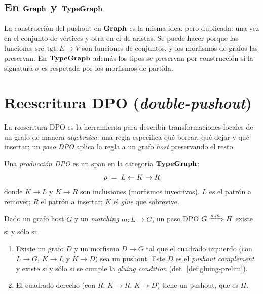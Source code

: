 \subsection*{En $\mathbf{Graph}$ y $\mathbf{TypeGraph}$}

La construcción del pushout en $\mathbf{Graph}$ es la misma idea, pero
duplicada: una vez en el conjunto de vértices y otra en el de aristas.
Se puede hacer porque las funciones $\mathrm{src}, \mathrm{tgt}: E \to
V$ son funciones de conjuntos, y los morfismos de grafos las preservan.
En $\mathbf{TypeGraph}$ además los tipos se preservan por construcción si la
signatura $\sigma$ es respetada por los morfismos de partida.

\section{Reescritura DPO (\emph{double-pushout})}

La reescritura DPO es la herramienta para describir transformaciones
locales de un grafo de manera \emph{algebraica}: una regla especifica
qué borrar, qué dejar y qué insertar; un \emph{paso DPO} aplica la
regla a un grafo \emph{host} preservando el resto.

\begin{defn}
\label{def:dpo-prelim}
Una \emph{producción DPO} es un span en la categoría $\mathbf{TypeGraph}$:
\[
  \rho \;=\; L \leftarrow K \rightarrow R
\]
donde $K \to L$ y $K \to R$ son inclusiones (morfismos inyectivos).
$L$ es el patrón a remover; $R$ el patrón a insertar; $K$ el
\emph{glue} que sobrevive.
\end{defn}

\begin{defn}
\label{def:dpo-step-prelim}
Dado un grafo host $G$ y un \emph{matching} $m: L \to G$, un paso DPO
$G \xRightarrow{\rho, m} H$ existe si y sólo si:
\begin{enumerate}
  \item Existe un grafo $D$ y un morfismo $D \to G$ tal que el cuadrado
    izquierdo (con $L \to G$, $K \to L$ y $K \to D$) sea un pushout.
    Este $D$ es el \emph{pushout complement} y existe si y sólo si se
    cumple la \emph{gluing condition} (def.~\ref{def:gluing-prelim}).
  \item El cuadrado derecho (con $R$, $K \to R$, $K \to D$) tiene un
    pushout, que es $H$.
\end{enumerate}
\end{defn}

